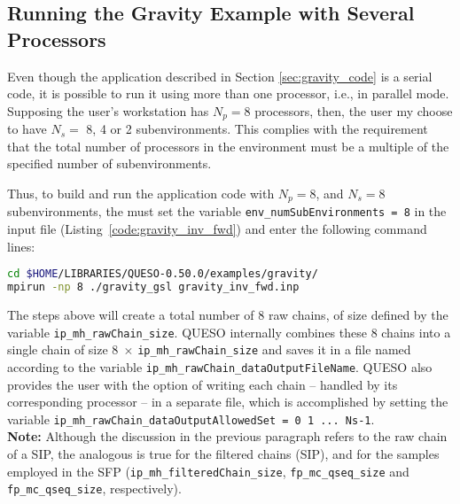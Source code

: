 




\subsection{Running the Gravity Example with Several Processors}

Even though the application described in Section \ref{sec:gravity_code} is a serial code, it is possible to run it using more than one processor, i.e., in parallel mode. 
Supposing the user's workstation has $N_p=8$ processors, then, the user my choose to have $N_s =$ 8, 4 or 2 subenvironments. This complies with the requirement that the total number of processors in the environment must be a multiple of the specified number of subenvironments.

Thus, to build and run the application code with $N_p = 8$, and $N_s=8$ subenvironments, the must set the variable \texttt{env\_numSubEnvironments = 8} in the input file (Listing~\ref{code:gravity_inv_fwd}) and enter the following command lines: 



\begin{lstlisting}[caption={}, label={},language={bash}]
cd $HOME/LIBRARIES/QUESO-0.50.0/examples/gravity/
mpirun -np 8 ./gravity_gsl gravity_inv_fwd.inp
\end{lstlisting}


The steps above will create a total number of 8 raw chains, of size defined by the variable \texttt{ip\_mh\_rawChain\_size}. QUESO internally combines these 8 chains into a single chain of size $8\; \times\,$\texttt{ip\_mh\_rawChain\_size} and saves it in a file named according to the variable \texttt{ip\_mh\_rawChain\_dataOutputFileName}. 
QUESO also provides the user with the option of writing each chain -- handled by its corresponding processor -- in a separate file, which is accomplished by setting the variable \texttt{ip\_mh\_rawChain\_dataOutputAllowedSet = 0 1 ... Ns-1}.\\

\noindent
{\bf Note:} Although the discussion in the previous paragraph refers to the raw chain of a SIP, the analogous is true for the filtered chains (SIP), and for the samples employed in the SFP (\texttt{ip\_mh\_filteredChain\_size},    \texttt{fp\_mc\_qseq\_size} and \texttt{fp\_mc\_qseq\_size}, respectively). 




